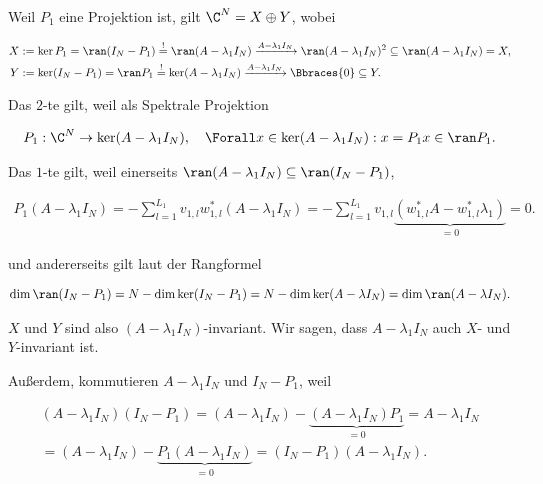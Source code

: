 \begin{remark} \label{rem:spektrale_projektion_linear}

    Weil $P_1$ eine Projektion ist, gilt $\C^N = X \oplus Y$, wobei

    \begin{align*}
        X & := \ker P_1 = \ran (I_N - P_1) \stackrel{!}{=} \ran (A - \lambda_1 I_N) \xrightarrow{A - \lambda_1 I_N} \ran (A - \lambda_1 I_N)^2 \subseteq \ran (A - \lambda_1 I_N) = X, \\
        Y & := \ker (I_N - P_1) = \ran P_1 \stackrel{!}{=} \ker (A - \lambda_1 I_N) \xrightarrow{A - \lambda_1 I_N} \Bbraces{0} \subseteq Y.
    \end{align*}

    Das $2$-te \Quote{!} gilt, weil als Spektrale Projektion

    \begin{align*}
        P_1: \C^N \to \ker (A - \lambda_1 I_N),
        \quad
        \Forall x \in \ker (A - \lambda_1 I_N):
            x = P_1 x \in \ran P_1.
    \end{align*}

    Das $1$-te \Quote{!} gilt, weil einerseits $\ran (A - \lambda_1 I_N) \subseteq \ran (I_N - P_1)$,

    \begin{align*}
        P_1 (A - \lambda_1 I_N)
        =
        -\sum_{l=1}^{L_1}
            v_{1, l} w_{1, l}^\ast
        (A - \lambda_1 I_N)
        =
        -\sum_{l=1}^{L_1}
            v_{1, l}
            \underbrace
            {
                (w_{1, l}^\ast A
                -
                w_{1, l}^\ast \lambda_1)
            }_{=0}
        =
        0.
    \end{align*}

    und andererseits gilt laut der Rangformel

    \begin{align*}
        \dim \ran (I_N - P_1)
        =
        N - \dim \ker (I_N - P_1)
        =
        N - \dim \ker (A - \lambda I_N)
        =
        \dim \ran (A - \lambda I_N).
    \end{align*}

    $X$ und $Y$ sind also $(A - \lambda_1 I_N)$-invariant.
    Wir sagen, dass $A - \lambda_1 I_N$ auch $X$- und $Y$-invariant ist.

    Außerdem, kommutieren $A - \lambda_1 I_N$ und $I_N - P_1$, weil

    \begin{multline*}
        (A - \lambda_1 I_N) (I_N - P_1)
        =
        (A - \lambda_1 I_N) - \underbrace{(A - \lambda_1 I_N) P_1}_{=0}
        =
        A - \lambda_1 I_N \\
        =
        (A - \lambda_1 I_N) - \underbrace{P_1 (A - \lambda_1 I_N)}_{=0}
        =
        (I_N - P_1) (A - \lambda_1 I_N).
    \end{multline*}

\end{remark}
